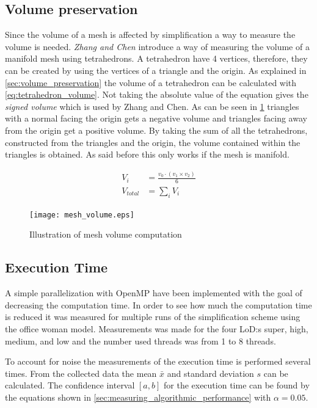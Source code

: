 \subsection{Volume preservation} \label{sec:computing_volume}
Since the volume of a mesh is affected by simplification a way to measure the volume is needed. \emph{Zhang and Chen} \cite{zhang2001efficient} introduce a way of measuring the volume of a manifold mesh using tetrahedrons. A tetrahedron have 4 vertices, therefore, they can be created by using the vertices of a triangle and the origin. As explained in \cref{sec:volume_preservation} the volume of a tetrahedron can be calculated with \cref{eq:tetrahedron_volume}. Not taking the absolute value of the equation gives the \emph{signed volume} which is used by Zhang and Chen. As can be seen in \cref{fig:mesh_volume} triangles with a normal facing the origin gets a negative volume and triangles facing away from the origin get a positive volume. By taking the sum of all the tetrahedrons, constructed from the triangles and the origin, the volume contained within the triangles is obtained. As said before this only works if the mesh is manifold.

\begin{align}
  V_i &= \frac{v_0 \cdot (v_1 \times v_2)}{6}\\
  V_{total} &= \sum_i{V_i}
\end{align}

\begin{figure}[h]
  \centering
  \texttt{[image: mesh\_volume.eps]}
  \caption{Illustration of mesh volume computation}
  \label{fig:mesh_volume}
  \end{figure}


\subsection{Execution Time} \label{sec:computation_time}
A simple parallelization with OpenMP have been implemented with the goal of decreasing the computation time. In order to see how much the computation time is reduced it was measured for multiple runs of the simplification scheme using the office woman model. Measurements was made for the four LoD:s super, high, medium, and low and the number used threads was from 1 to 8 threads.

To account for noise the measurements of the execution time is performed several times. From the collected data the mean \(\bar{x}\) and standard deviation \(s\) can be calculated. The confidence interval \([a, b]\) for the execution time can be found by the equations shown in \cref{sec:measuring_algorithmic_performance} with \(\alpha = 0.05\).


